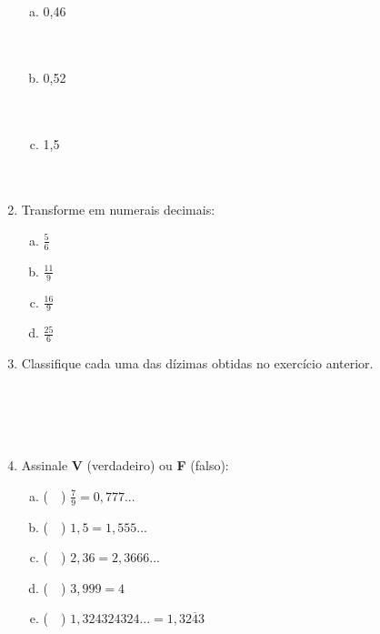 \documentclass[a4paper,14pt]{article}
\begin{document}
\begin{multicols}{2}
\begin{enumerate}
\begin{enumerate}[a)]
				\item 0,46 \\\\\\
				\item 0,52 \\\\\\
				\item 1,5 \\\\\\
			\end{enumerate}
			\item Transforme em numerais decimais:
			\begin{enumerate}[a)]
				\item $\frac{5}{6}$
				\item $\frac{11}{9}$
				\item $\frac{16}{9}$
				\item $\frac{25}{6}$
			\end{enumerate}
			\item Classifique cada uma das dízimas obtidas no exercício anterior. \\\\\\\\\\
			\item Assinale \textbf{V} (verdadeiro) ou \textbf{F} (falso):
			\begin{enumerate}[a)]
				\item (~~) $\frac{7}{9} = 0,777...$
				\item (~~) $1,5 = 1,555...$
				\item (~~) $2,36 = 2,3666...$
				\item (~~) $3,999 = 4$
				\item (~~) $1,324324324... = 1,3\overline{243}$
			\end{enumerate}
		\end{enumerate}
		$~$ \\ $~$ \\ $~$ \\
	\end{multicols}
\end{document}
